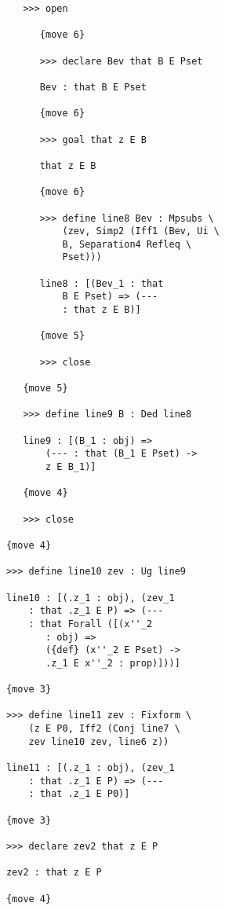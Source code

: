 \documentclass[12pt]{article}
\begin{document}
\begin{verbatim}
               >>> open

                  {move 6}

                  >>> declare Bev that B E Pset

                  Bev : that B E Pset

                  {move 6}

                  >>> goal that z E B

                  that z E B

                  {move 6}

                  >>> define line8 Bev : Mpsubs \
                      (zev, Simp2 (Iff1 (Bev, Ui \
                      B, Separation4 Refleq \
                      Pset)))

                  line8 : [(Bev_1 : that 
                      B E Pset) => (--- 
                      : that z E B)]

                  {move 5}

                  >>> close

               {move 5}

               >>> define line9 B : Ded line8

               line9 : [(B_1 : obj) => 
                   (--- : that (B_1 E Pset) -> 
                   z E B_1)]

               {move 4}

               >>> close

            {move 4}

            >>> define line10 zev : Ug line9

            line10 : [(.z_1 : obj), (zev_1 
                : that .z_1 E P) => (--- 
                : that Forall ([(x''_2 
                   : obj) => 
                   ({def} (x''_2 E Pset) -> 
                   .z_1 E x''_2 : prop)]))]

            {move 3}

            >>> define line11 zev : Fixform \
                (z E P0, Iff2 (Conj line7 \
                zev line10 zev, line6 z))

            line11 : [(.z_1 : obj), (zev_1 
                : that .z_1 E P) => (--- 
                : that .z_1 E P0)]

            {move 3}

            >>> declare zev2 that z E P

            zev2 : that z E P

            {move 4}


\end{verbatim}
\end{document}
